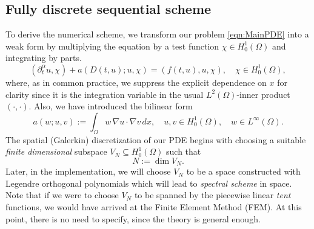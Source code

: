 \documentclass[12pt,a4paper]{article}
\begin{document}
\subsection{Fully discrete sequential scheme}
To derive the numerical scheme, we transform our problem \eqref{eqn:MainPDE} into a weak form by multiplying the equation by a test function $\chi \in H_0^1(\Omega)$ and integrating by parts.
\begin{equation}\label{eqn:MainPDEWeak}
	\left(\partial^\alpha_t u, \chi\right) + a(D(t,u); u, \chi) = (f(t,u), u, \chi), \quad \chi \in H_0^1(\Omega),
\end{equation}
where, as in common practice, we suppress the explicit dependence on $x$ for clarity since it is the integration variable in the usual $L^2(\Omega)$-inner product $(\cdot, \cdot)$. Also, we have introduced the bilinear form
\begin{equation}\label{eqn:AForm}
	a(w; u,v) := \int_\Omega w \, \nabla u \cdot \nabla v \,dx, \quad u, v \in H_0^1(\Omega), \quad w \in L^\infty(\Omega). 
\end{equation} 
The spatial (Galerkin) discretization of our PDE begins with choosing a suitable \emph{finite dimensional} subspace $V_N \subseteq H_0^1(\Omega)$ such that
\begin{equation}
	N := \dim V_N. 
\end{equation} 
Later, in the implementation, we will choose $V_N$ to be a space constructed with Legendre orthogonal polynomials which will lead to \emph{spectral scheme} in space. Note that if we were to choose $V_N$ to be spanned by the piecewise linear \emph{tent} functions, we would have arrived at the Finite Element Method (FEM). At this point, there is no need to specify, since the theory is general enough. 
\end{document}
